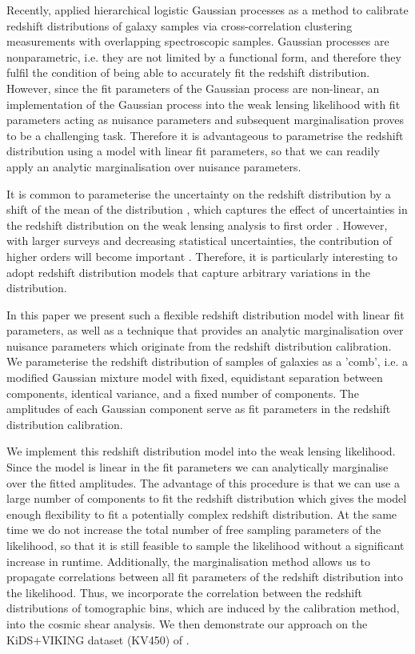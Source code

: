 \documentclass{aa}
\begin{document}
 Recently, \cite{2020MNRAS.491.4768R} applied hierarchical logistic Gaussian processes as a method to calibrate redshift distributions of galaxy samples via cross-correlation clustering measurements with overlapping spectroscopic samples. Gaussian processes are nonparametric, i.e. they are not limited by a functional form, and therefore they fulfil the condition of being able to accurately fit the redshift distribution. However, since the fit parameters of the Gaussian process are non-linear, an implementation of the Gaussian process into the weak lensing likelihood with fit parameters acting as nuisance parameters and subsequent marginalisation proves to be a challenging task. Therefore it is advantageous to parametrise the redshift distribution using a model with linear fit parameters, so that we can readily apply an analytic marginalisation over nuisance parameters.
 
 It is common to parameterise the uncertainty on the redshift distribution by a shift of the mean of the distribution \citep{hildebrandt18, hildebrandt20, HSC2, DES3}, which captures the effect of uncertainties in the redshift distribution on the weak lensing analysis to first order \citep{amara}. However, with larger surveys and decreasing statistical uncertainties, the contribution of higher orders will become important \citep{wright_som}. Therefore, it is particularly interesting to adopt redshift distribution models that capture arbitrary variations in the distribution.

In this paper we present such a flexible redshift distribution model with linear fit parameters, as well as a technique that provides an analytic marginalisation over nuisance parameters which originate from the redshift distribution calibration. We parameterise the redshift distribution of samples of galaxies as a 'comb', i.e. a modified Gaussian mixture model with fixed, equidistant separation between components, identical variance, and a fixed number of components. The amplitudes of each Gaussian component serve as fit parameters in the redshift distribution calibration. 

We implement this redshift distribution model into the weak lensing likelihood. Since the model is linear in the fit parameters we can analytically marginalise over the fitted amplitudes. The advantage of this procedure is that we can use a large number of components to fit the redshift distribution which gives the model enough flexibility to fit a potentially complex redshift distribution. At the same time we do not increase the total number of free sampling parameters of the likelihood, so that it is still feasible to sample the likelihood without a significant increase in runtime. Additionally, the marginalisation method allows us to propagate correlations between all fit parameters of the redshift distribution into the likelihood. Thus, we incorporate the correlation between the redshift distributions of tomographic bins, which are induced by the calibration method, into the cosmic shear analysis. We then demonstrate our approach on the KiDS+VIKING dataset (KV450) of \cite{hildebrandt18}.
\end{document}

